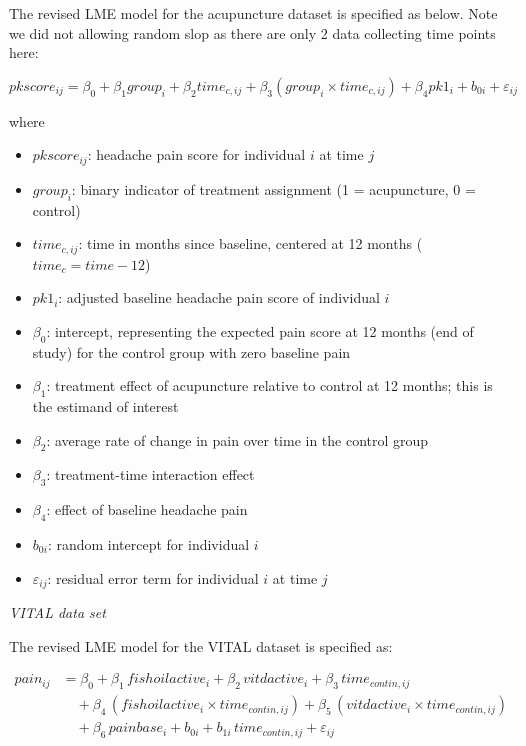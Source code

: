 \documentclass{article}
\providecommand{\tightlist}{%
  \setlength{\itemsep}{0pt}\setlength{\parskip}{0pt}}
\begin{document}
The revised LME model for the acupuncture dataset is specified as below.
Note we did not allowing random slop as there are only 2 data collecting
time points here:

\[pkscore_{ij} = \beta_0 + \beta_1 group_i + \beta_2 time_{c,ij} + \beta_3 (group_i \times time_{c,ij}) + \beta_4 pk1_i + b_{0i} + \varepsilon_{ij}\]

where

\begin{itemize}
\tightlist
\item
  \(pkscore_{ij}\): headache pain score for individual \(i\) at time
  \(j\)
\item
  \(group_i\): binary indicator of treatment assignment (1 =
  acupuncture, 0 = control)
\item
  \(time_{c,ij}\): time in months since baseline, centered at 12 months
  (\(time_c = time - 12\))
\item
  \(pk1_i\): adjusted baseline headache pain score of individual \(i\)
\item
  \(\beta_0\): intercept, representing the expected pain score at 12
  months (end of study) for the control group with zero baseline pain
\item
  \(\beta_1\): treatment effect of acupuncture relative to control at 12
  months; this is the estimand of interest
\item
  \(\beta_2\): average rate of change in pain over time in the control
  group
\item
  \(\beta_3\): treatment-time interaction effect
\item
  \(\beta_4\): effect of baseline headache pain
\item
  \(b_{0i}\): random intercept for individual \(i\)
\item
  \(\varepsilon_{ij}\): residual error term for individual \(i\) at time
  \(j\)
\end{itemize}

\emph{VITAL data set}

The revised LME model for the VITAL dataset is specified as:

\begin{align*}
pain_{ij} &= \beta_0 + \beta_1\, fishoilactive_i + \beta_2\, vitdactive_i + \beta_3\, time_{contin,ij} \\
&\quad + \beta_4\, (fishoilactive_i \times time_{contin,ij}) + \beta_5\, (vitdactive_i \times time_{contin,ij}) \\
&\quad + \beta_6\, painbase_i + b_{0i} + b_{1i}\, time_{contin,ij} + \varepsilon_{ij}
\end{align*}
\end{document}
